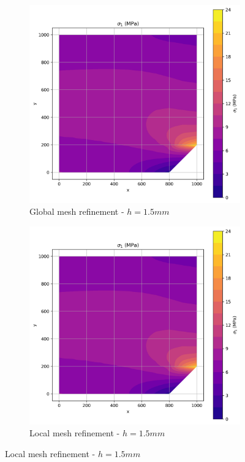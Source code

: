 \begin{figure}[H]
  \centering
  \begin{subfigure}[b]{0.45\textwidth}
    \centering
    \includegraphics[width=\textwidth]{GRAFICOS/Quad4/1.5mm_global/resultados - sigma_1.png}
    \caption{Global mesh refinement - $h=1.5mm$}
    \label{fig:img12}
  \end{subfigure}
  \hfill
  \begin{subfigure}[b]{0.45\textwidth}
    \centering
    \includegraphics[width=\textwidth]{GRAFICOS/Quad4/1.5mm_global/resultados - sigma_1.png}
    \caption{Local mesh refinement - $h=1.5mm$}
    \label{fig:img22}
  \end{subfigure}
\end{figure}

